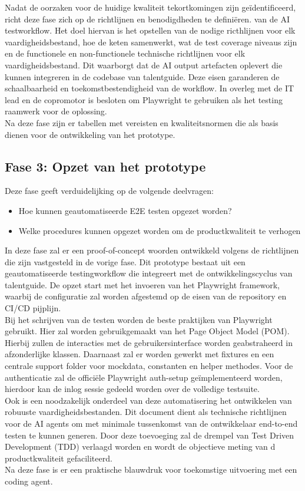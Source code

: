 Nadat de oorzaken voor de huidige kwaliteit tekortkomingen zijn geïdentificeerd, richt deze fase zich op de richtlijnen en benodigdheden te definiëren. van de AI testworkflow. Het doel hiervan is het opstellen van de nodige ricthlijnen voor elk vaardigheidsbestand, hoe de keten samenwerkt, wat de test coverage niveaus zijn en de functionele en non-functionele technische richtlijnen voor elk vaardigheidsbestand. Dit waarborgt dat de AI output artefacten oplevert die kunnen integreren in de codebase van talentguide.
Deze eisen garanderen de schaalbaarheid en toekomstbestendigheid van de workflow. In overleg met de IT lead en de copromotor is besloten om Playwright te gebruiken als het testing raamwerk voor de oplossing.
\bigskip
\\
Na deze fase zijn er tabellen met vereisten en kwaliteitsnormen die als basis dienen voor de ontwikkeling van het prototype.


\subsection{Fase 3: Opzet van het prototype}
Deze fase geeft verduidelijking op de volgende deelvragen:
\begin{itemize}
    \item Hoe kunnen geautomatiseerde E2E testen opgezet worden?
    \item Welke procedures kunnen opgezet worden om de productkwaliteit te verhogen
\end{itemize}

In deze fase zal er een proof-of-concept woorden ontwikkeld volgens de richtlijnen die zijn vastgesteld in de vorige fase. Dit prototype bestaat uit een geautomatiseerde testingworkflow die integreert met de ontwikkelingscyclus van talentguide. De opzet start met het invoeren van het Playwright framework, waarbij de configuratie zal worden afgestemd op de eisen van de repository en CI/CD pijplijn.
\bigskip
\\
Bij het schrijven van de testen worden de beste praktijken van Playwright gebruikt. Hier zal worden gebruikgemaakt van het Page Object Model (POM). Hierbij zullen de interacties met de gebruikersinterface worden geabstraheerd in afzonderlijke klassen. Daarnaast zal er worden gewerkt met fixtures en een centrale support folder voor mockdata, constanten en helper methodes. Voor de authenticatie zal de officiële Playwright auth-setup geïmplementeerd worden, hierdoor kan de inlog sessie gedeeld worden over de volledige testsuite.
\bigskip
\\
Ook is een noodzakelijk onderdeel van deze automatisering het ontwikkelen van robuuste vaardigheidsbestanden. Dit document dient als technische richtlijnen voor de AI agents om met minimale tussenkomst van de ontwikkelaar end-to-end testen te kunnen generen. Door deze toevoeging zal de drempel van Test Driven Development (TDD) verlaagd worden en wordt de objectieve meting van d productkwaliteit gefaciliteerd.
\bigskip
\\
Na deze fase is er een praktische blauwdruk voor toekomstige uitvoering met een coding agent.



